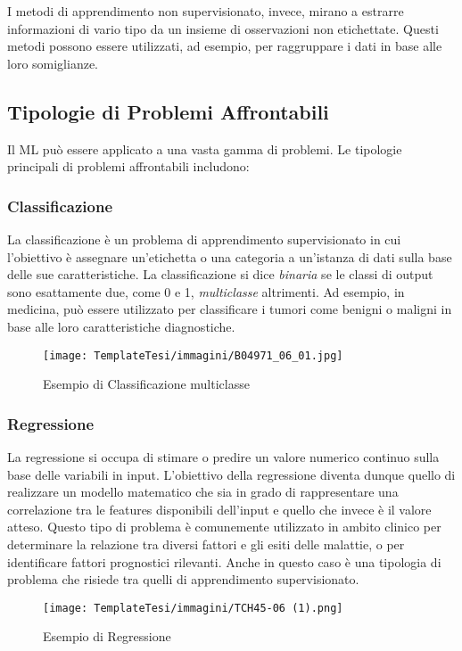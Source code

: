 \begin{flushleft}
I metodi di apprendimento non supervisionato, invece, mirano a estrarre informazioni di vario tipo da un insieme di osservazioni non etichettate. Questi metodi possono essere utilizzati, ad esempio, per raggruppare i dati in base alle loro somiglianze.

\subsection{Tipologie di Problemi Affrontabili}
Il ML può essere applicato a una vasta gamma di problemi. Le tipologie principali di problemi affrontabili includono:

\subsubsection{Classificazione}
La classificazione è un problema di apprendimento supervisionato in cui l'obiettivo è assegnare un'etichetta o una categoria a un'istanza di dati sulla base delle sue caratteristiche.
La classificazione  si dice \emph{binaria} se le classi di output sono esattamente due, come 0 e 1, \emph{multiclasse} altrimenti.
Ad esempio, in medicina, può essere utilizzato per classificare i tumori come benigni o maligni in base alle loro caratteristiche diagnostiche.

\begin{figure}[H]
    \centering
    \texttt{[image: TemplateTesi/immagini/B04971\_06\_01.jpg]}
    \caption{Esempio di Classificazione multiclasse \cite{ImmClassificazione}}
    \label{fig:my_label}
\end{figure}

\subsubsection{Regressione}

La regressione si occupa di stimare o predire un valore numerico continuo sulla base delle variabili in input. 
L’obiettivo della regressione diventa dunque quello di realizzare un modello matematico che sia in grado di rappresentare una correlazione tra le features disponibili dell’input e quello che invece è il valore atteso. Questo tipo di problema è comunemente utilizzato in ambito clinico per determinare la relazione tra  diversi fattori e gli esiti delle malattie, o per identificare fattori prognostici rilevanti.\cite{Regressione}
Anche in questo caso è una tipologia di problema che risiede tra quelli di apprendimento supervisionato.
\begin{figure}[H]
    \centering
    \texttt{[image: TemplateTesi/immagini/TCH45-06 (1).png]}
    \caption{Esempio di Regressione \cite{ImmRegressione}}
    \label{fig:my_label}
\end{figure}


\end{flushleft}
